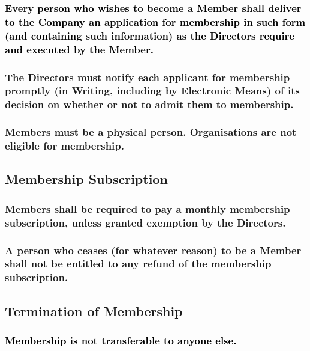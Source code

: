 \documentclass[12pt]{article}
\def\fakecolour{black}
\begin{document}
\subsubsection[Potential Members Must Apply for Membership]{\textcolor{\fakecolour}{Every person who wishes to become a Member shall deliver to the Company an application for membership in such form (and containing such information) as the Directors require and executed by the Member.}} %
\subsubsection[Directors Must notify Potential Members of Decision]{The Directors must notify each applicant for membership promptly (in Writing, including by Electronic Means) of its decision on whether or not to admit them to membership.} %
\subsubsection[Members May Not Be Organisations]{Members must be a physical person. Organisations are not eligible for membership.} %

\subsection{Membership Subscription}
\subsubsection[Members Pay Monthly Subscription]{Members shall be required to pay a monthly membership subscription, unless granted exemption by the Directors.}
\subsubsection[Members Not Entitled to Refund of Subscription]{A person who ceases (for whatever reason) to be a Member shall not be entitled to any refund of the membership subscription.}

\subsection{Termination of Membership}
\subsubsection[Membership Non-Transferable]{\textcolor{\fakecolour}{Membership is not transferable to anyone else.}}
\end{document}
